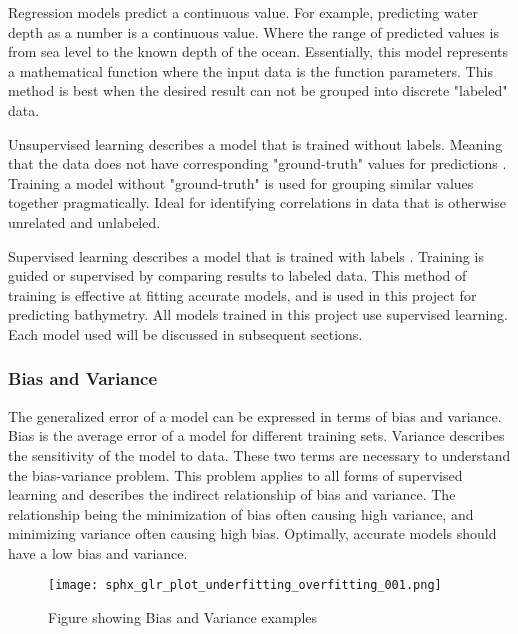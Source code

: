 \par
Regression models predict a continuous value.
For example, predicting water depth as a number is a continuous value.
Where the range of predicted values is from sea level to the known depth of the ocean.
Essentially, this model represents a mathematical function where the input data is the function parameters.
This method is best when the desired result can not be grouped into discrete "labeled" data.

\par
Unsupervised learning describes a model that is trained without labels.
Meaning that the data does not have corresponding "ground-truth" values for predictions \cite{bishop2006pattern}.
Training a model without "ground-truth" is used for grouping similar values together pragmatically.
Ideal for identifying correlations in data that is otherwise unrelated and unlabeled.

\par
Supervised learning describes a model that is trained with labels \cite{bishop2006pattern}.
Training is guided or supervised by comparing results to labeled data.
This method of training is effective at fitting accurate models, and is used in this project for predicting bathymetry.
All models trained in this project use supervised learning.
Each model used will be discussed in subsequent sections.

\subsubsection{Bias and Variance}
The generalized error of a model can be expressed in terms of bias and variance.
Bias is the average error of a model for different training sets.
Variance describes the sensitivity of the model to data.
These two terms are necessary to understand the bias-variance problem.
This problem applies to all forms of supervised learning \cite{geman1992neural} and describes the indirect relationship of bias and variance.
The relationship being the minimization of bias often causing high variance, and minimizing variance often causing high bias.
Optimally, accurate models should have a low bias and variance.

\begin{figure}[h]
    \centering
    \texttt{[image: sphx\_glr\_plot\_underfitting\_overfitting\_001.png]}
    \caption{Figure showing Bias and Variance examples}
    \label{}
\end{figure}

